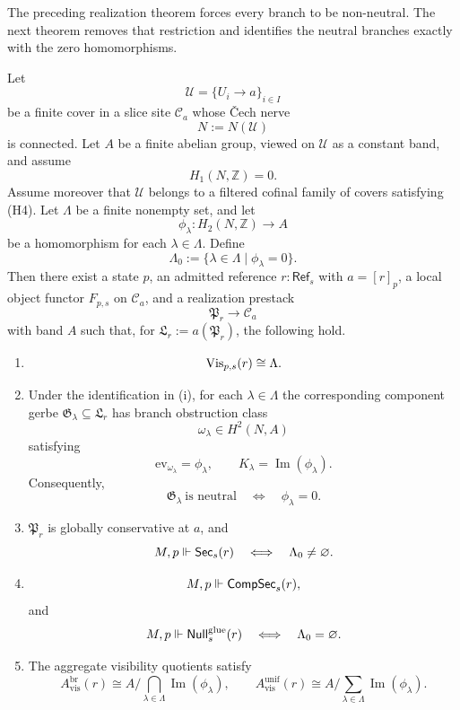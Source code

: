 The preceding realization theorem forces every branch to be non-neutral. The next theorem removes that restriction and identifies the neutral branches exactly with the zero homomorphisms.

\begin{theorem}\label{thm:mixed-branch-realization}
Let
\[
\mathcal U=\{U_i\to a\}_{i\in I}
\]
be a finite cover in a slice site $\mathcal C_a$ whose \v{C}ech nerve
\[
N:=N(\mathcal U)
\]
is connected. Let $A$ be a finite abelian group, viewed on $\mathcal U$ as a constant band, and assume
\[
H_1(N,\mathbb Z)=0.
\]
Assume moreover that $\mathcal U$ belongs to a filtered cofinal family of covers satisfying \textup{(H4)}. Let $\Lambda$ be a finite nonempty set, and let
\[
\phi_\lambda:H_2(N,\mathbb Z)\to A
\]
be a homomorphism for each $\lambda\in\Lambda$. Define
\[
\Lambda_0:=\{\lambda\in\Lambda\mid \phi_\lambda=0\}.
\]
Then there exist a state $p$, an admitted reference $r:\mathsf{Ref}_s$ with $a=[r]_p$, a local object functor $F_{p,s}$ on $\mathcal C_a$, and a realization prestack
\[
\mathfrak P_r\to \mathcal C_a
\]
with band $A$ such that, for $\mathfrak L_r:=a(\mathfrak P_r)$, the following hold.
\begin{enumerate}[label=(\roman*),nosep]
\item
\[
\mathrm{Vis}_{p,s}(r)\cong \Lambda.
\]
\item Under the identification in \textup{(i)}, for each $\lambda\in\Lambda$ the corresponding component gerbe $\mathfrak G_\lambda\subseteq \mathfrak L_r$ has branch obstruction class
\[
\omega_\lambda\in H^2(N,A)
\]
satisfying
\[
\mathrm{ev}_{\omega_\lambda}=\phi_\lambda,
\qquad
K_\lambda=\operatorname{Im}(\phi_\lambda).
\]
Consequently,
\[
\mathfrak G_\lambda\ \text{is neutral}
\quad\Longleftrightarrow\quad
\phi_\lambda=0.
\]
\item $\mathfrak P_r$ is globally conservative at $a$, and
\[
M,p\Vdash \mathsf{Sec}_s(r)
\quad\Longleftrightarrow\quad
\Lambda_0\neq\varnothing.
\]
\item
\[
M,p\Vdash \mathsf{CompSec}_s(r),
\]
and
\[
M,p\Vdash \mathsf{Null}^{\mathrm{glue}}_s(r)
\quad\Longleftrightarrow\quad
\Lambda_0=\varnothing.
\]
\item The aggregate visibility quotients satisfy
\[
A_{\mathrm{vis}}^{\mathrm{br}}(r)\cong A\Big/\bigcap_{\lambda\in\Lambda}\operatorname{Im}(\phi_\lambda),
\qquad
A_{\mathrm{vis}}^{\mathrm{unif}}(r)\cong A\Big/\sum_{\lambda\in\Lambda}\operatorname{Im}(\phi_\lambda).
\]
\end{enumerate}
\end{theorem}

